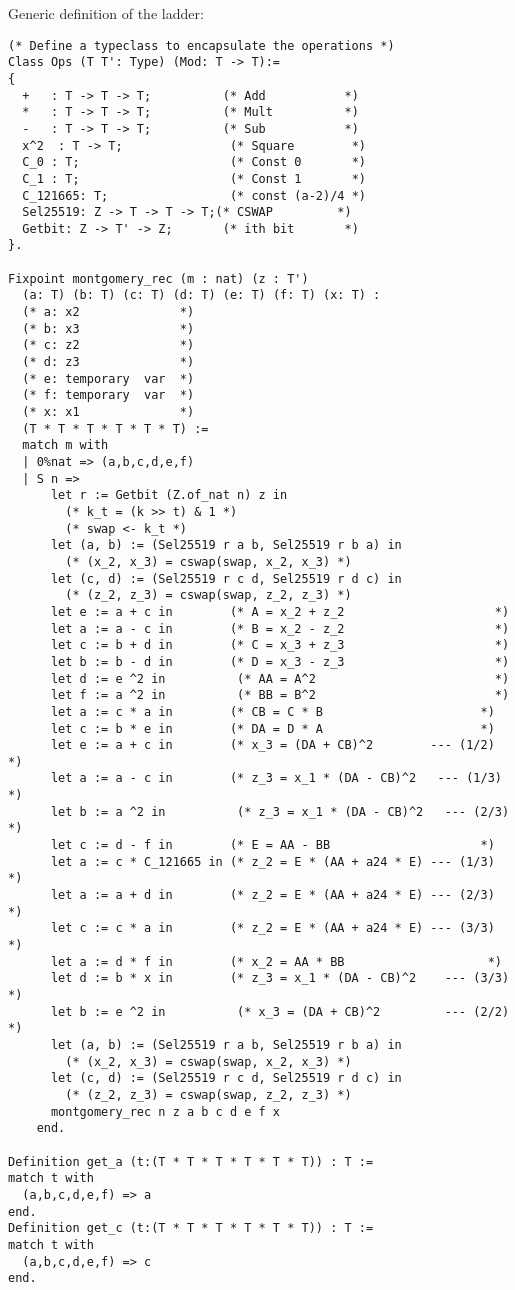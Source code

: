 \documentclass{article}
\begin{document}
Generic definition of the ladder:

\begin{lstlisting}[language=Coq]
(* Define a typeclass to encapsulate the operations *)
Class Ops (T T': Type) (Mod: T -> T):=
{
  +   : T -> T -> T;          (* Add           *)
  *   : T -> T -> T;          (* Mult          *)
  -   : T -> T -> T;          (* Sub           *)
  x^2  : T -> T;               (* Square        *)
  C_0 : T;                     (* Const 0       *)
  C_1 : T;                     (* Const 1       *)
  C_121665: T;                 (* const (a-2)/4 *)
  Sel25519: Z -> T -> T -> T;(* CSWAP         *)
  Getbit: Z -> T' -> Z;       (* ith bit       *)
}.

Fixpoint montgomery_rec (m : nat) (z : T')
  (a: T) (b: T) (c: T) (d: T) (e: T) (f: T) (x: T) :
  (* a: x2              *)
  (* b: x3              *)
  (* c: z2              *)
  (* d: z3              *)
  (* e: temporary  var  *)
  (* f: temporary  var  *)
  (* x: x1              *)
  (T * T * T * T * T * T) :=
  match m with
  | 0%nat => (a,b,c,d,e,f)
  | S n =>
      let r := Getbit (Z.of_nat n) z in
        (* k_t = (k >> t) & 1 *)
        (* swap <- k_t *)
      let (a, b) := (Sel25519 r a b, Sel25519 r b a) in
        (* (x_2, x_3) = cswap(swap, x_2, x_3) *)
      let (c, d) := (Sel25519 r c d, Sel25519 r d c) in
        (* (z_2, z_3) = cswap(swap, z_2, z_3) *)
      let e := a + c in        (* A = x_2 + z_2                     *)
      let a := a - c in        (* B = x_2 - z_2                     *)
      let c := b + d in        (* C = x_3 + z_3                     *)
      let b := b - d in        (* D = x_3 - z_3                     *)
      let d := e ^2 in          (* AA = A^2                         *)
      let f := a ^2 in          (* BB = B^2                         *)
      let a := c * a in        (* CB = C * B                      *)
      let c := b * e in        (* DA = D * A                      *)
      let e := a + c in        (* x_3 = (DA + CB)^2        --- (1/2)  *)
      let a := a - c in        (* z_3 = x_1 * (DA - CB)^2   --- (1/3)  *)
      let b := a ^2 in          (* z_3 = x_1 * (DA - CB)^2   --- (2/3)  *)
      let c := d - f in        (* E = AA - BB                     *)
      let a := c * C_121665 in (* z_2 = E * (AA + a24 * E) --- (1/3) *)
      let a := a + d in        (* z_2 = E * (AA + a24 * E) --- (2/3) *)
      let c := c * a in        (* z_2 = E * (AA + a24 * E) --- (3/3) *)
      let a := d * f in        (* x_2 = AA * BB                    *)
      let d := b * x in        (* z_3 = x_1 * (DA - CB)^2    --- (3/3) *)
      let b := e ^2 in          (* x_3 = (DA + CB)^2         --- (2/2) *)
      let (a, b) := (Sel25519 r a b, Sel25519 r b a) in
        (* (x_2, x_3) = cswap(swap, x_2, x_3) *)
      let (c, d) := (Sel25519 r c d, Sel25519 r d c) in
        (* (z_2, z_3) = cswap(swap, z_2, z_3) *)
      montgomery_rec n z a b c d e f x
    end.

Definition get_a (t:(T * T * T * T * T * T)) : T :=
match t with
  (a,b,c,d,e,f) => a
end.
Definition get_c (t:(T * T * T * T * T * T)) : T :=
match t with
  (a,b,c,d,e,f) => c
end.
\end{lstlisting}
\end{document}
